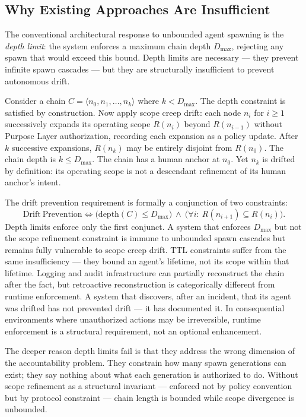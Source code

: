 \subsection{Why Existing Approaches Are Insufficient}

The conventional architectural response to unbounded agent spawning is the \emph{depth limit}: the system enforces a maximum chain depth $D_{\max}$, rejecting any spawn that would exceed this bound. Depth limits are necessary — they prevent infinite spawn cascades — but they are structurally insufficient to prevent autonomous drift.

Consider a chain $C = \langle n_0, n_1, \ldots, n_k \rangle$ where $k < D_{\max}$. The depth constraint is satisfied by construction. Now apply scope creep drift: each node $n_i$ for $i \geq 1$ successively expands its operating scope $R(n_i)$ beyond $R(n_{i-1})$ without Purpose Layer authorization, recording each expansion as a policy update. After $k$ successive expansions, $R(n_k)$ may be entirely disjoint from $R(n_0)$. The chain depth is $k \leq D_{\max}$. The chain has a human anchor at $n_0$. Yet $n_k$ is drifted by definition: its operating scope is not a descendant refinement of its human anchor's intent.

The drift prevention requirement is formally a conjunction of two constraints:
\begin{equation}
\mathrm{Drift\ Prevention} \iff \bigl(\mathrm{depth}(C) \leq D_{\max}\bigr)\ \land\ \bigl(\forall i:\ R(n_{i+1}) \subseteq R(n_i)\bigr).
\label{eq:intro-drift-prevention}
\end{equation}
Depth limits enforce only the first conjunct. A system that enforces $D_{\max}$ but not the scope refinement constraint is immune to unbounded spawn cascades but remains fully vulnerable to scope creep drift. TTL constraints suffer from the same insufficiency — they bound an agent's lifetime, not its scope within that lifetime. Logging and audit infrastructure can partially reconstruct the chain after the fact, but retroactive reconstruction is categorically different from runtime enforcement. A system that discovers, after an incident, that its agent was drifted has not prevented drift — it has documented it. In consequential environments where unauthorized actions may be irreversible, runtime enforcement is a structural requirement, not an optional enhancement.

The deeper reason depth limits fail is that they address the wrong dimension of the accountability problem. They constrain how many spawn generations can exist; they say nothing about what each generation is authorized to do. Without scope refinement as a structural invariant — enforced not by policy convention but by protocol constraint — chain length is bounded while scope divergence is unbounded.

